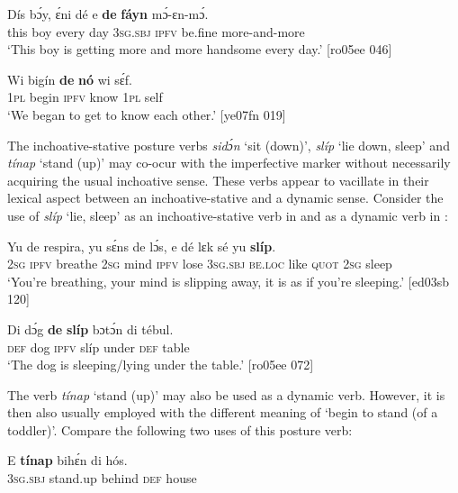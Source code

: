 \ea%
    \label{ex:key:302}
    \gll Dís  bɔ́y,    ɛ́ni    dé  e    \textbf{de}  \textbf{fáyn}  mɔ́-ɛn-mɔ́.\\
this  boy    every  day  \textsc{3sg.sbj}  \textsc{ipfv}  be.fine  more-and-more\\

\glt ‘This boy is getting more and more handsome every day.’ [ro05ee 046]
\z


\ea%
    \label{ex:key:303}
    \gll Wi  bigín  \textbf{de}  \textbf{nó}    wi  sɛ́f.\\
\textsc{1pl}  begin  \textsc{ipfv}  know  \textsc{1pl}  self\\

\glt ‘We began to get to know each other.’ [ye07fn 019]
\z

The inchoative-stative posture verbs \textit{sidɔ́n} ‘sit (down)’, \textit{slíp} ‘lie down, sleep’ and \textit{tínap} ‘stand (up)’ may co-ocur with the imperfective marker without necessarily acquiring the usual inchoative sense. These verbs appear to vacillate in their lexical aspect between an inchoative-stative and a dynamic sense. Consider the use of \textit{slíp} ‘lie, sleep’ as an inchoative-stative verb in  and as a dynamic verb in :


\ea%
    \label{ex:key:304}
    \gll Yu  de  respira,  yu  sɛ́ns    de  lɔ́s,  e    dé
lɛk    sé    yu  \textbf{slíp}.\\
\textsc{2sg}  \textsc{ipfv}  breathe  \textsc{2sg}  mind  \textsc{ipfv}  lose  \textsc{3sg.sbj}  \textsc{be.loc}
like    \textsc{quot}    \textsc{2sg}  sleep\\

\glt ‘You’re breathing, your mind is slipping away, it is as if you’re sleeping.’ [ed03sb 120]
\z


\ea%
    \label{ex:key:305}
    \gll Di  dɔ́g  \textbf{de}  \textbf{slíp}  bɔtɔ́n  di  tébul.\\
\textsc{def}  dog  \textsc{ipfv}  slíp  under  \textsc{def}  table\\

\glt ‘The dog is sleeping/lying under the table.’ [ro05ee 072]
\z

The verb \textit{tínap} ‘stand (up)’ may also be used as a dynamic verb. However, it is then also usually employed with the different meaning of ‘begin to stand (of a toddler)’. Compare the following two uses of this posture verb: 


\ea%
    \label{ex:key:306}
    \gll E    \textbf{tínap}  bihɛ́n  di  hós.\\
\textsc{3sg.sbj}  stand.up  behind  \textsc{def}  house\\

